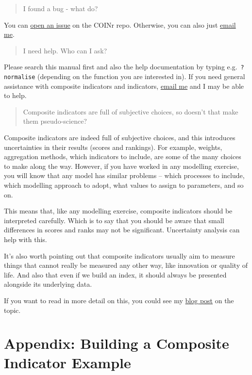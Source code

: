 \documentclass[
]{book}
\begin{document}
\begin{quote}
I found a bug - what do?
\end{quote}

You can \href{https://github.com/bluefoxr/COINr/issues}{open an issue} on the COINr repo. Otherwise, you can also just \href{mailto:william.becker@bluefoxdata.eu}{email me}.

\begin{quote}
I need help. Who can I ask?
\end{quote}

Please search this manual first and also the help documentation by typing e.g.~\texttt{?normalise} (depending on the function you are interested in). If you need general assistance with composite indicators and indicators, \href{mailto:william.becker@bluefoxdata.eu}{email me} and I may be able to help.

\begin{quote}
Composite indicators are full of subjective choices, so doesn't that make them pseudo-science?
\end{quote}

Composite indicators are indeed full of subjective choices, and this introduces uncertainties in their results (scores and rankings). For example, weights, aggregation methods, which indicators to include, are some of the many choices to make along the way. However, if you have worked in any modelling exercise, you will know that any model has similar problems -- which processes to include, which modelling approach to adopt, what values to assign to parameters, and so on.

This means that, like any modelling exercise, composite indicators should be interpreted carefully. Which is to say that you should be aware that small differences in scores and ranks may not be significant. Uncertainty analysis can help with this.

It's also worth pointing out that composite indicators usually aim to measure things that cannot really be measured any other way, like innovation or quality of life. And also that even if we build an index, it should always be presented alongside its underlying data.

If you want to read in more detail on this, you could see my \href{https://www.bluefoxdata.eu/blog/2020-11-17-whycompositeindicators/}{blog post} on the topic.

\hypertarget{appendix-building-a-composite-indicator-example}{%
\chapter{Appendix: Building a Composite Indicator Example}\label{appendix-building-a-composite-indicator-example}}
\end{document}
